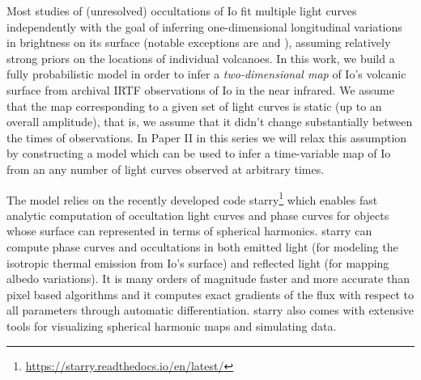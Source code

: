\documentclass[linenumbers,modern]{aastex62}
\begin{document}
Most studies of (unresolved) occultations of Io fit multiple light curves independently with the goal of inferring one-dimensional longitudinal variations in brightness on its surface (notable exceptions are \cite{spencer1994} and \cite{dekleer2017}), assuming relatively strong priors on the locations of individual volcanoes.
In this work, we build a fully probabilistic model in order to infer a \emph{two-dimensional map} of Io's volcanic surface from archival IRTF observations of Io in the near infrared.
We assume that the map corresponding to a given set of light curves is static (up to an overall amplitude), that is, we assume that it didn't change substantially between the times of observations.
In Paper II in this series we will relax this assumption by constructing a model which can be used to infer a time-variable map of Io from an any number of light curves observed at arbitrary times.

The model relies on the recently developed code \textsf{starry}\footnote{\url{https://starry.readthedocs.io/en/latest/}} \citep{luger2019a,luger2021b} which enables fast analytic computation of occultation light curves and phase curves for objects whose surface can represented in terms of spherical harmonics.
\textsf{starry} can compute phase curves and occultations in both emitted light (for modeling the isotropic thermal emission from Io's surface) and reflected light (for mapping albedo variations).
It is many orders of magnitude faster and more accurate than pixel based algorithms and it computes exact gradients of the flux with respect to all parameters through automatic differentiation.
\textsf{starry} also comes with extensive tools for visualizing spherical harmonic maps and simulating data.
\end{document}

